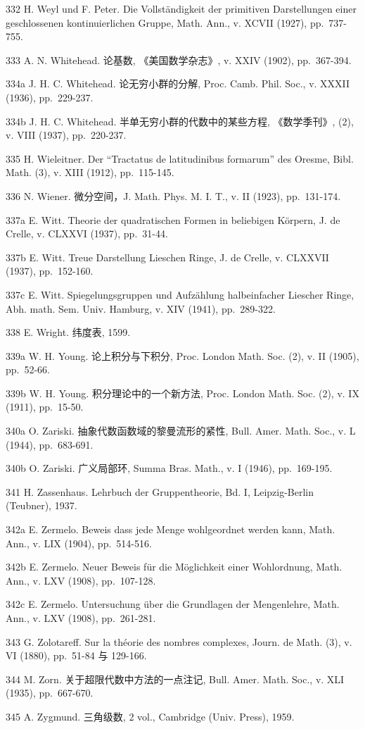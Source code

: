 332 H. Weyl und F. Peter. Die Vollständigkeit der primitiven Darstellungen einer geschlossenen kontinuierlichen Gruppe, Math. Ann., v. XCVII (1927), pp.~737-755.

333 A. N. Whitehead. 论基数, 《美国数学杂志》, v. XXIV (1902), pp.~367-394.

334a J. H. C. Whitehead. 论无穷小群的分解, Proc. Camb. Phil. Soc., v. XXXII (1936), pp.~229-237.

334b J. H. C. Whitehead. 半单无穷小群的代数中的某些方程, 《数学季刊》, (2), v. VIII (1937), pp.~220-237.

335 H. Wieleitner. Der ``Tractatus de latitudinibus formarum'' des Oresme, Bibl. Math. (3), v. XIII (1912), pp.~115-145.

336 N. Wiener. 微分空间，J. Math. Phys. M. I. T., v. II (1923), pp.~131-174.

337a E. Witt. Theorie der quadratischen Formen in beliebigen Körpern, J. de Crelle, v. CLXXVI (1937), pp.~31-44.

337b E. Witt. Treue Darstellung Lieschen Ringe, J. de Crelle, v. CLXXVII (1937), pp.~152-160.

337c E. Witt. Spiegelungsgruppen und Aufzählung halbeinfacher Liescher Ringe, Abh. math. Sem. Univ. Hamburg, v. XIV (1941), pp.~289-322.

338 E. Wright. 纬度表, 1599.

339a W. H. Young. 论上积分与下积分, Proc. London Math. Soc. (2), v. II (1905), pp.~52-66.

339b W. H. Young. 积分理论中的一个新方法, Proc. London Math. Soc. (2), v. IX (1911), pp.~15-50.

340a O. Zariski. 抽象代数函数域的黎曼流形的紧性, Bull. Amer. Math. Soc., v. L (1944), pp.~683-691.

340b O. Zariski. 广义局部环, Summa Bras. Math., v. I (1946), pp.~169-195.

341 H. Zassenhaus. Lehrbuch der Gruppentheorie, Bd. I, Leipzig-Berlin (Teubner), 1937.

342a E. Zermelo. Beweis dass jede Menge wohlgeordnet werden kann, Math. Ann., v. LIX (1904), pp.~514-516.

342b E. Zermelo. Neuer Beweis für die Möglichkeit einer Wohlordnung, Math. Ann., v. LXV (1908), pp.~107-128.

342c E. Zermelo. Untersuchung über die Grundlagen der Mengenlehre, Math. Ann., v. LXV (1908), pp.~261-281.

343 G. Zolotareff. Sur la théorie des nombres complexes, Journ. de Math. (3), v. VI (1880), pp.~51-84 与 129-166.

344 M. Zorn. 关于超限代数中方法的一点注记, Bull. Amer. Math. Soc., v. XLI (1935), pp.~667-670.

345 A. Zygmund. 三角级数, 2 vol., Cambridge (Univ. Press), 1959.
\relax{}
